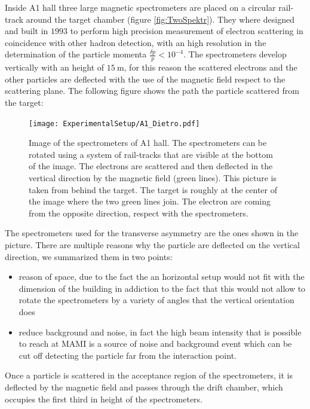 Inside A1 hall three large magnetic spectrometers are placed on a circular rail-track around the target chamber (figure \ref{fig:TwoSpektr}). They where designed and built in $1993$ to perform high precision measurement of electron scattering in coincidence with other hadron detection, with an high resolution in the determination of the particle momenta $\frac{\delta p}{p} < 10^{-4}$. The spectrometers develop vertically with an height of $\SI{15}{\meter}$, for this reason the scattered electrons and the other particles are deflected with the use of the magnetic field respect to the scattering plane. The following figure shows the path the particle scattered from the target:
\begin{figure}
\centering
\caption{Image of the spectrometers of A1 hall. The spectrometers can be rotated using a system of rail-tracks that are visible at the bottom of the image. The electrons are scattered and then deflected in the vertical direction by the magnetic field (green lines). This picture is taken from behind the target. The target is roughly at the center of the image where the two green lines join. The electron are coming from the opposite direction, respect with the spectrometers.}\label{fig:TwoDetectors}
\texttt{[image: ExperimentalSetup/A1\_Dietro.pdf]}
\end{figure}
The spectrometers used for the transverse asymmetry are the ones shown in the picture. There are multiple reasons why the particle are deflected on the vertical direction, we summarized them in two points: 
\begin{itemize}
\item reason of space, due to the fact the an horizontal setup would not fit with the dimension of the building in addiction to the fact that this would not allow to rotate the spectrometers by a variety of angles that the vertical orientation does
\item reduce background and noise, in fact the high beam intensity that is possible to reach at MAMI is a source of noise and background event which can be cut off detecting the particle far from the interaction point.
\end{itemize}      
Once a particle is scattered in the acceptance region of the spectrometers, it is deflected by the magnetic field and passes through the drift chamber, which occupies the first third in height of the spectrometers. 
